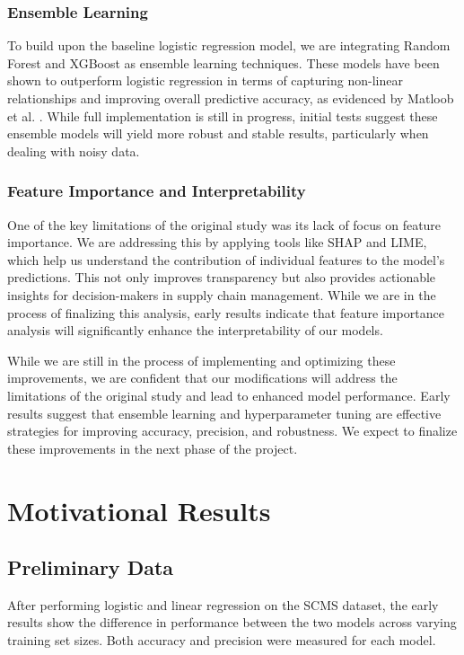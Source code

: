 \documentclass[conference]{IEEEtran}
\begin{document}
\subsubsection{Ensemble Learning}

To build upon the baseline logistic regression model, we are integrating Random Forest and XGBoost as ensemble learning techniques. These models have been shown to outperform logistic regression in terms of capturing non-linear relationships and improving overall predictive accuracy, as evidenced by Matloob et al. \cite{matloob2021software}. While full implementation is still in progress, initial tests suggest these ensemble models will yield more robust and stable results, particularly when dealing with noisy data.


\subsubsection{Feature Importance and Interpretability}

One of the key limitations of the original study was its lack of focus on feature importance. We are addressing this by applying tools like SHAP and LIME, which help us understand the contribution of individual features to the model’s predictions. This not only improves transparency but also provides actionable insights for decision-makers in supply chain management. While we are in the process of finalizing this analysis, early results indicate that feature importance analysis will significantly enhance the interpretability of our models.

While we are still in the process of implementing and optimizing these improvements, we are confident that our modifications will address the limitations of the original study and lead to enhanced model performance. Early results suggest that ensemble learning and hyperparameter tuning are effective strategies for improving accuracy, precision, and robustness. We expect to finalize these improvements in the next phase of the project.

\section{Motivational Results}

\subsection{Preliminary Data}
After performing logistic and linear regression on the SCMS dataset, the early results show the difference in performance between the two models across varying training set sizes. Both accuracy and precision were measured for each model.
\end{document}
